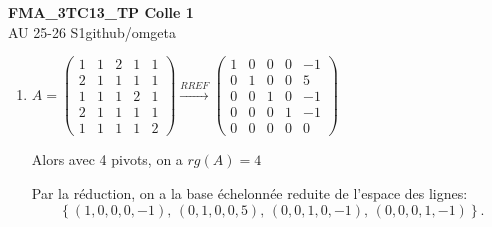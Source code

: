 \documentclass[12pt, a4paper]{article}
\newcommand{\mytitle}{FMA\_3TC13\_TP Colle 1}
\newcommand{\myauthor}{github/omgeta}
\newcommand{\mydate}{AU 25-26 S1}
\begin{document}
\raggedright
\footnotesize
\begin{center}
{\normalsize{\textbf{\mytitle}}} \\
{\footnotesize{\mydate\hspace{2pt}\textemdash\hspace{2pt}\myauthor}}
\end{center}
\begin{enumerate}
  \item $A = \left(\begin{array}{ccccc} 1 & 1 & 2 & 1 & 1\\ 2 & 1 & 1 & 1 & 1\\ 1 & 1 & 1 & 2 & 1\\ 2 & 1 & 1 & 1 & 1\\ 1 & 1 & 1 & 1 & 2 \end{array}\right) \xrightarrow{RREF} \left(\begin{array}{ccccc} 1 & 0 & 0 & 0 & -1\\ 0 & 1 & 0 & 0 & 5\\ 0 & 0 & 1 & 0 & -1\\ 0 & 0 & 0 & 1 & -1\\ 0 & 0 & 0 & 0 & 0 \end{array}\right)$

    Alors avec 4 pivots, on a $\boxed{rg(A) = 4}$

    Par la réduction, on a la base échelonnée reduite de l'espace des lignes:
    \[
    \boxed{
    \left\{
    (1,0,0,0,-1),\,
    (0,1,0,0,5),\,
    (0,0,1,0,-1),\,
    (0,0,0,1,-1)
    \right\}.
    }
    \]


\end{enumerate}
\end{document}
